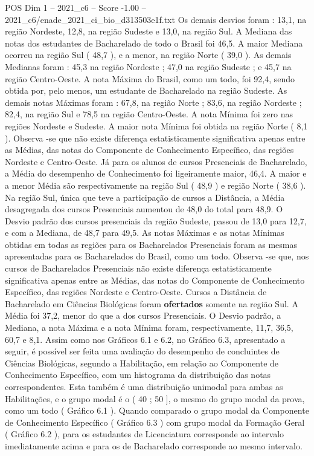 \begin{textsample}{POS Dim 1 – 2021\_c6 – Score -1.00 – 2021\_c6/enade\_2021\_ci\_bio\_d313503e1f.txt}
Os demais desvios foram : 13,1, na região Nordeste, 12,8, na região Sudeste e 13,0, na região Sul.
A Mediana das notas dos estudantes de Bacharelado de todo o Brasil foi 46,5.
A maior Mediana ocorreu na região Sul ( 48,7 ), e a menor, na região Norte ( 39,0 ).
As demais Medianas foram : 45,3 na região Nordeste ; 47,0 na região Sudeste ; e 45,7 na região Centro-Oeste.
A nota Máxima do Brasil, como um todo, foi 92,4, sendo obtida por, pelo menos, um estudante de Bacharelado na região Sudeste.
As demais notas Máximas foram : 67,8, na região Norte ; 83,6, na região Nordeste ; 82,4, na região Sul e 78,5 na região Centro-Oeste.
A nota Mínima foi zero nas regiões Nordeste e Sudeste.
A maior nota Mínima foi obtida na região Norte ( 8,1 ).
Observa -se que não existe diferença estatisticamente significativa apenas entre as Médias, das notas do Componente de Conhecimento Específico, das regiões Nordeste e Centro-Oeste.
Já para os alunos de cursos Presenciais de Bacharelado, a Média do desempenho de Conhecimento foi ligeiramente maior, 46,4.
A maior e a menor Média são respectivamente na região Sul ( 48,9 ) e região Norte ( 38,6 ).
Na região Sul, única que teve a participação de cursos a Distância, a Média desagregada dos cursos Presenciais aumentou de 48,0 do total para 48,9.
O Desvio padrão dos cursos presenciais da região Sudeste, passou de 13,0 para 12,7, e com a Mediana, de 48,7 para 49,5.
As notas Máximas e as notas Mínimas obtidas em todas as regiões para os Bacharelados Presenciais foram as mesmas apresentadas para os Bacharelados do Brasil, como um todo.
Observa -se que, nos cursos de Bacharelados Presenciais não existe diferença estatisticamente significativa apenas entre as Médias, das notas do Componente de Conhecimento Específico, das regiões Nordeste e Centro-Oeste.
Cursos a Distância de Bacharelado em Ciências Biológicas foram \textbf{ofertados} somente na região Sul.
A Média foi 37,2, menor do que a dos cursos Presenciais.
O Desvio padrão, a Mediana, a nota Máxima e a nota Mínima foram, respectivamente, 11,7, 36,5, 60,7 e 8,1.
Assim como nos Gráficos 6.1 e 6.2, no Gráfico 6.3, apresentado a seguir, é possível ser feita uma avaliação do desempenho de concluintes de Ciências Biológicas, segundo a Habilitação, em relação ao Componente de Conhecimento Específico, com um histograma da distribuição das notas correspondentes.
Esta também é uma distribuição unimodal para ambas as Habilitações, e o grupo modal é o ( 40 ; 50 ], o mesmo do grupo modal da prova, como um todo ( Gráfico 6.1 ).
Quando comparado o grupo modal da Componente de Conhecimento Específico ( Gráfico 6.3 ) com grupo modal da Formação Geral ( Gráfico 6.2 ), para os estudantes de Licenciatura corresponde ao intervalo imediatamente acima e para os de Bacharelado corresponde ao mesmo intervalo.

\end{textsample}
